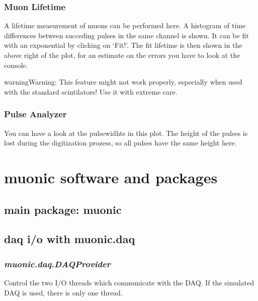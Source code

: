 \documentclass[letterpaper,10pt,english]{sphinxmanual}
\begin{document}
\subsection{Muon Lifetime}
\label{tutorial:muon-lifetime}
A lifetime measurement of muons can be performed here. A histogram of time differences between succeding pulses in the same channel is shown. It can be fit with an exponential by clicking on `Fit!'. The fit lifetime is then shown in the above right of the plot, for an estimate on the errors you have to look at the console.

\begin{notice}{warning}{Warning:}
This feature might not work properly, especially when used with the standard scintilators! Use it with extreme care.
\end{notice}


\subsection{Pulse Analyzer}
\label{tutorial:pulse-analyzer}
You can have a look at the pulsewidhts in this plot. The height of the pulses is lost during the digitization prozess, so all pulses have the same height here.


\chapter{muonic software and packages}
\label{muonic::doc}\label{muonic:muonic-software-and-packages}

\section{main package: muonic}
\label{muonic:module-muonic}\label{muonic:main-package-muonic}
{\hyperref[muonic:module-muonic.gui]{}}
{\hyperref[muonic:module-muonic.analysis]{}}


\section{daq i/o with muonic.daq}
\label{muonic:daq-i-o-with-muonic-daq}

\subsection{\emph{muonic.daq.DAQProvider}}
\label{muonic:muonic-daq-daqprovider}
Control the two I/O threads which communicate with the DAQ. If the simulated DAQ is used, there is only one thread.
\label{muonic:module-muonic.daq.DAQProvider}
\end{document}
